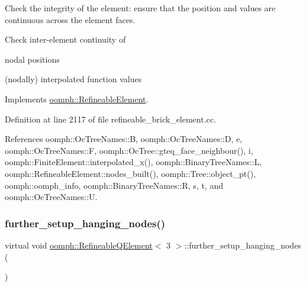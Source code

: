 Check the integrity of the element\+: ensure that the position and values are continuous across the element faces. 

Check inter-\/element continuity of
\begin{DoxyItemize}
\item nodal positions
\item (nodally) interpolated function values 
\end{DoxyItemize}

Implements \hyperlink{classoomph_1_1RefineableElement_ae665f2d2eb0b6410ddcb101caa80922a}{oomph\+::\+Refineable\+Element}.



Definition at line 2117 of file refineable\+\_\+brick\+\_\+element.\+cc.



References oomph\+::\+Oc\+Tree\+Names\+::B, oomph\+::\+Oc\+Tree\+Names\+::D, e, oomph\+::\+Oc\+Tree\+Names\+::F, oomph\+::\+Oc\+Tree\+::gteq\+\_\+face\+\_\+neighbour(), i, oomph\+::\+Finite\+Element\+::interpolated\+\_\+x(), oomph\+::\+Binary\+Tree\+Names\+::L, oomph\+::\+Refineable\+Element\+::nodes\+\_\+built(), oomph\+::\+Tree\+::object\+\_\+pt(), oomph\+::oomph\+\_\+info, oomph\+::\+Binary\+Tree\+Names\+::R, s, t, and oomph\+::\+Oc\+Tree\+Names\+::U.

\mbox{\label{classoomph_1_1RefineableQElement_3_013_01_4_aae91537ebb3f511bf48397b3324f424a}} 
\subsubsection{\texorpdfstring{further\+\_\+setup\+\_\+hanging\+\_\+nodes()}{further\_setup\_hanging\_nodes()}}
{\footnotesize\ttfamily virtual void \hyperlink{classoomph_1_1RefineableQElement}{oomph\+::\+Refineable\+Q\+Element}$<$ 3 $>$\+::further\+\_\+setup\+\_\+hanging\+\_\+nodes (\begin{DoxyParamCaption}{ }\end{DoxyParamCaption})\hspace{0.3cm}{\ttfamily [pure virtual]}}



